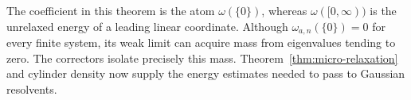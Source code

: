 The coefficient in this theorem is the atom $\omega(\{0\})$, whereas
$\omega([0,\infty))$ is the unrelaxed energy of a leading linear coordinate.
Although $\omega_{a,n}(\{0\})=0$ for every finite system, its weak limit can
acquire mass from eigenvalues tending to zero. The correctors isolate
precisely this mass. Theorem~\ref{thm:micro-relaxation} and cylinder density
now supply the energy estimates needed to pass to Gaussian resolvents.
